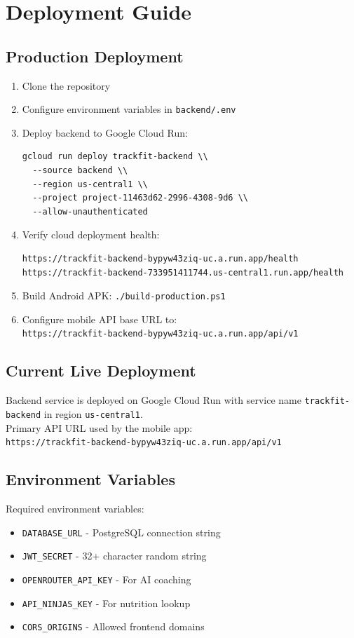 \documentclass[12pt]{report}
\begin{document}
\chapter{Deployment Guide}
\section{Production Deployment}
\begin{enumerate}
    \item Clone the repository
    \item Configure environment variables in \texttt{backend/.env}
    \item Deploy backend to Google Cloud Run:
\begin{verbatim}
gcloud run deploy trackfit-backend \\
  --source backend \\
  --region us-central1 \\
  --project project-11463d62-2996-4308-9d6 \\
  --allow-unauthenticated
\end{verbatim}
    \item Verify cloud deployment health:
\begin{verbatim}
https://trackfit-backend-bypyw43ziq-uc.a.run.app/health
https://trackfit-backend-733951411744.us-central1.run.app/health
\end{verbatim}
    \item Build Android APK: \texttt{./build-production.ps1}
    \item Configure mobile API base URL to:\\
    \texttt{https://trackfit-backend-bypyw43ziq-uc.a.run.app/api/v1}
\end{enumerate}

\section{Current Live Deployment}
Backend service is deployed on Google Cloud Run with service name \texttt{trackfit-backend} in region \texttt{us-central1}.\\
Primary API URL used by the mobile app:\\
\texttt{https://trackfit-backend-bypyw43ziq-uc.a.run.app/api/v1}

\section{Environment Variables}
Required environment variables:
\begin{itemize}
    \item \texttt{DATABASE_URL} - PostgreSQL connection string
    \item \texttt{JWT_SECRET} - 32+ character random string
    \item \texttt{OPENROUTER\_API\_KEY} - For AI coaching
    \item \texttt{API\_NINJAS\_KEY} - For nutrition lookup
    \item \texttt{CORS\_ORIGINS} - Allowed frontend domains
\end{itemize}
\end{document}
